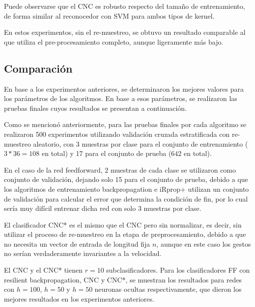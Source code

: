 Puede observarse que el CNC es robusto respecto del tamaño de entrenamiento, de forma similar al reconocedor con SVM para ambos tipos de kernel.  

En estos experimentos, sin el re-muestreo, se obtuvo un resultado comparable al que utiliza el pre-procesamiento completo, aunque ligeramente más bajo.

\subsection{Comparación}


En base a los experimentos anteriores, se determinaron los mejores valores para los parámetros de los algoritmos. En base a esos parámetros, se realizaron las pruebas finales cuyos resultados se presentan a continuación.

Como se mencionó anteriormente, para las pruebas finales por cada algoritmo se realizaron 500 experimentos utilizando validación cruzada estratificada con re-muestreo aleatorio, con 3 muestras por clase para el conjunto de entrenamiento ($3*36=108$ en total) y 17 para el conjunto de prueba ($642$ en total). 

En el caso de la red feedforward, 2 muestras de cada clase se utilizaron como conjunto de validación, dejando solo 15 para el conjunto de prueba, debido a que los algoritmos de entrenamiento backpropagation e iRprop+ utilizan un conjunto de validación para calcular el error que determina la condición de fin, por lo cual sería muy difícil entrenar dicha red con solo 3 muestras por clase.

El clasificador CNC* es el mismo que el CNC pero sin normalizar, es decir, sin utilizar el proceso de re-muestreo en la etapa de preprocesamiento, debido a que no necesita un vector de entrada de longitud fija $n$, aunque en este caso los gestos no serían verdaderamente invariantes a la velocidad.

El CNC y el CNC* tienen $r=10$ subclasificadores. Para los clasificadores FF con resilient backpropagation, CNC y CNC*, se muestran los resultados para redes con $h=100$, $h=50$ y $h=50$ neuronas ocultas respectivamente, que dieron los mejores resultados en los experimentos anteriores.


